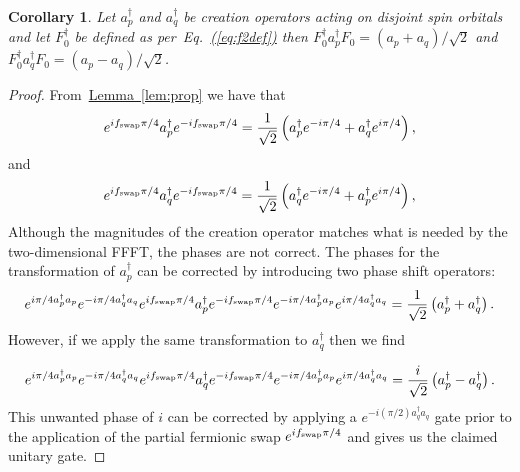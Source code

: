 \documentclass[superscriptaddress,aps,pra,nofootinbib,notitlepage,10pt,longbibliography]{revtex4-1}
\newtheorem{corollary}[theorem]{Corollary}
\newcommand{\eq}[1]{Eq.~\hyperref[eq:#1]{(\ref*{eq:#1})}}
\newcommand{\lem}[1]{\hyperref[lem:#1]{Lemma~\ref*{lem:#1}}}
\begin{document}
\begin{corollary}
Let $a^\dagger_p$ and $a^\dagger_q$ be creation operators acting on disjoint spin orbitals and let $F_0^\dagger$ be defined as per~\eq{f2def} then $F_0^\dagger a_p^\dagger F_0 = (a_p+a_q)/\sqrt{2}$ and $F_0^\dagger a_q^\dagger F_0 = (a_p-a_q)/\sqrt{2}$.\label{cor:2dfour}
\end{corollary}
\begin{proof}
From~\lem{prop} we have that
\begin{equation}
e^{if_{\rm swap}\pi/4}a_p^\dagger e^{-if_{\rm swap}\pi/4}=\frac{1}{\sqrt{2}}\left(a_p^\dagger e^{-i\pi/4}+a_q^\dagger e^{i\pi/4} \right),
\end{equation}
and
\begin{equation}
e^{if_{\rm swap}\pi/4}a_q^\dagger e^{-if_{\rm swap}\pi/4}=\frac{1}{\sqrt{2}}\left(a_q^\dagger e^{-i\pi/4}+a_p^\dagger e^{i\pi/4} \right),
\end{equation}
Although the magnitudes of the creation operator matches what is needed by the two-dimensional FFFT, the phases are not correct.  The phases for the transformation of $a_p^\dagger$ can be corrected by introducing two phase shift operators:
\begin{equation}
e^{i\pi/4 a_p^\dagger a_p}e^{-i\pi/4 a_q^\dagger a_q} e^{if_{\rm swap}\pi/4}a_p^\dagger e^{-if_{\rm swap}\pi/4} e^{-i\pi/4 a_p^\dagger a_p}e^{i\pi/4 a_q^\dagger a_q} = \frac{1}{\sqrt{2}}\left(a_{p}^\dagger + a_{q}^\dagger \right).
\end{equation}
However, if we apply the same transformation to $a_q^\dagger$ then we find

\begin{equation}
e^{i\pi/4 a_p^\dagger a_p}e^{-i\pi/4 a_q^\dagger a_q} e^{if_{\rm swap}\pi/4}a_q^\dagger e^{-if_{\rm swap}\pi/4} e^{-i\pi/4 a_p^\dagger a_p}e^{i\pi/4 a_q^\dagger a_q} = \frac{i}{\sqrt{2}}\left(a_{p}^\dagger - a_{q}^\dagger \right).
\end{equation}
This unwanted phase of $i$ can be corrected by applying a $e^{-i(\pi/2)a_q^\dagger a_q}$ gate prior to the application of the partial fermionic swap $e^{if_{\rm swap}\pi/4}$ and gives us the claimed unitary gate.
\end{proof}
\end{document}
